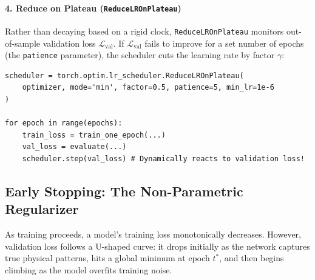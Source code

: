 \paragraph{4. Reduce on Plateau (\texttt{ReduceLROnPlateau})}
Rather than decaying based on a rigid clock, \texttt{ReduceLROnPlateau} monitors out-of-sample validation loss $\mathcal{L}_{\text{val}}$. If $\mathcal{L}_{\text{val}}$ fails to improve for a set number of epochs (the \texttt{patience} parameter), the scheduler cuts the learning rate by factor $\gamma$:
\begin{lstlisting}[style=pythonstyle]
scheduler = torch.optim.lr_scheduler.ReduceLROnPlateau(
    optimizer, mode='min', factor=0.5, patience=5, min_lr=1e-6
)

for epoch in range(epochs):
    train_loss = train_one_epoch(...)
    val_loss = evaluate(...)
    scheduler.step(val_loss) # Dynamically reacts to validation loss!
\end{lstlisting}

\subsection{Early Stopping: The Non-Parametric Regularizer}\label{subsec:early_stopping}

As training proceeds, a model's training loss monotonically decreases. However, validation loss follows a U-shaped curve: it drops initially as the network captures true physical patterns, hits a global minimum at epoch $t^*$, and then begins climbing as the model overfits training noise.


